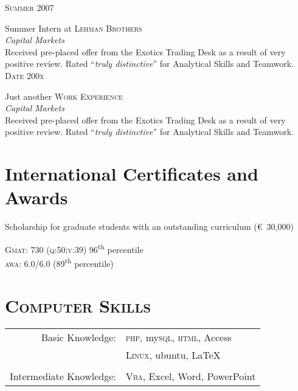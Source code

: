 \documentclass[10pt]{article}
\begin{document}
{\begin{minipage}[t]{0.5\textwidth}
	\raggedleft
	\textsc{\normalsize Summer 2007}\par

	\raggedright\large Summer Intern at \textsc{Lehman Brothers}\\
	\emph{Capital Markets}\\[5pt]

	\normalsize{Received pre-placed offer from the Exotics Trading Desk as a result of very positive review. Rated ``\emph{truly distinctive}'' for Analytical Skills and Teamwork.}\\[10pt]

	\raggedleft
	\textsc{\normalsize Date 200x}\par

	\raggedright\large Just another \textsc{Work Experience}\\
	\emph{Capital Markets}\\[5pt]

	\normalsize{Received pre-placed offer from the Exotics Trading Desk as a result of very positive review. Rated ``\emph{truly distinctive}'' for Analytical Skills and Teamwork.}\\[10pt]

\section{International Certificates and Awards}
	\par\raggedright
	Scholarship for graduate students with an outstanding curriculum (\euro\  30,000)\normalsize\\[3pt]
	
	\par\raggedright
	\textsc{Gmat}\textregistered: 730 (\textsc{q:50;v:39}) 96\textsuperscript{th} percentile\\ \textsc{awa}: 6.0/6.0 (89\textsuperscript{th} percentile)\\[10pt]

\section{\textsc{Computer Skills}}

	\begin{tabular}{rl}
		Basic Knowledge:	& \textsc{php}, my\textsc{sql}, \textsc{html}, Access\\
						& \textsc{Linux}, ubuntu, {\LaTeX}\\ 
						& \\
	Intermediate Knowledge: & \textsc{Vba}, Excel, Word, PowerPoint\\
	\end{tabular}
	

\end{minipage}}
\end{document}
